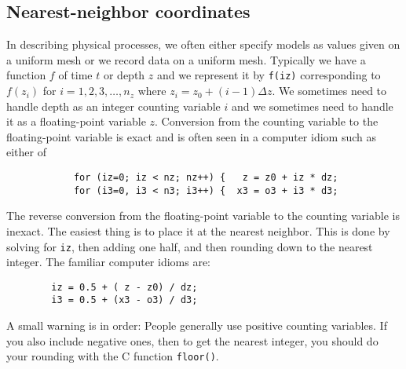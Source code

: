 \subsection{Nearest-neighbor coordinates}
In describing physical processes,
we often either specify models as values given on a uniform mesh
or we record data on a uniform mesh.
Typically we have
a function $f$ of time $t$ or depth $z$
and we represent it by {\tt f(iz)}
corresponding to $f(z_i)$ for $i=1,2,3,\ldots, n_z$
where $z_i = z_0+ (i-1)\Delta z$.
We sometimes need to handle depth as
an integer counting variable $i$
and we sometimes need to handle it as
a floating-point variable $z$.
Conversion from the counting variable to the floating-point variable
is exact and is often seen in a computer idiom
such as either of \begin{verbatim}
            for (iz=0; iz < nz; nz++) {   z = z0 + iz * dz; 
            for (i3=0, i3 < n3; i3++) {  x3 = o3 + i3 * d3;
\end{verbatim}
The reverse conversion from the floating-point variable
to the counting variable is inexact.
The easiest thing is to place it at the nearest neighbor.
This is done by solving for {\tt iz}, then adding one half,
and then rounding down to the nearest integer.
The familiar computer idioms are:\begin{verbatim}
        iz = 0.5 + ( z - z0) / dz;
        i3 = 0.5 + (x3 - o3) / d3;
\end{verbatim}
A small warning is in order:
People generally use positive counting variables.
If you also include negative ones,
then to get the nearest integer,
you should do your rounding with the C function {\tt floor()}.

